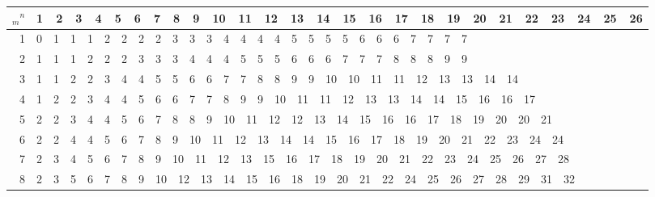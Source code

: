 \documentclass[11pt]{article}
\begin{document}
    \begin{center}
        \tiny
        \begin{tabular}{r|l}
            \hline
            ${}_m{}^n$ & 1~~\phantom{0}2~~\phantom{0}3~~\phantom{0}4~~\phantom{0}5~~\phantom{0}6~~\phantom{0}7~~\phantom{0}8~~\phantom{0}9~~10~~11~~12~~13~~14~~15~~16~~17~~18~~19~~20~~21~~22~~23~~24~~25~~26 \\
            \hline
            1 & 0~~\phantom{0}1~~\phantom{0}1~~\phantom{0}1~~\phantom{0}2~~\phantom{0}2~~\phantom{0}2~~\phantom{0}2~~\phantom{0}3~~\phantom{0}3~~\phantom{0}3~~\phantom{0}4~~\phantom{0}4~~\phantom{0}4~~\phantom{0}4~~\phantom{0}5~~\phantom{0}5~~\phantom{0}5~~\phantom{0}5~~\phantom{0}6~~\phantom{0}6~~\phantom{0}6~~\phantom{0}7~~\phantom{0}7~~\phantom{0}7~~\phantom{0}7 \\
            2 & 1~~\phantom{0}1~~\phantom{0}1~~\phantom{0}2~~\phantom{0}2~~\phantom{0}2~~\phantom{0}3~~\phantom{0}3~~\phantom{0}3~~\phantom{0}4~~\phantom{0}4~~\phantom{0}4~~\phantom{0}5~~\phantom{0}5~~\phantom{0}5~~\phantom{0}6~~\phantom{0}6~~\phantom{0}6~~\phantom{0}7~~\phantom{0}7~~\phantom{0}7~~\phantom{0}8~~\phantom{0}8~~\phantom{0}8~~\phantom{0}9~~\phantom{0}9 \\
            3 & 1~~\phantom{0}1~~\phantom{0}2~~\phantom{0}2~~\phantom{0}3~~\phantom{0}4~~\phantom{0}4~~\phantom{0}5~~\phantom{0}5~~\phantom{0}6~~\phantom{0}6~~\phantom{0}7~~\phantom{0}7~~\phantom{0}8~~\phantom{0}8~~\phantom{0}9~~\phantom{0}9~~10~~10~~11~~11~~12~~13~~13~~14~~14 \\
            4 & 1~~\phantom{0}2~~\phantom{0}2~~\phantom{0}3~~\phantom{0}4~~\phantom{0}4~~\phantom{0}5~~\phantom{0}6~~\phantom{0}6~~\phantom{0}7~~\phantom{0}7~~\phantom{0}8~~\phantom{0}9~~\phantom{0}9~~10~~11~~11~~12~~13~~13~~14~~14~~15~~16~~16~~17 \\
            5 & 2~~\phantom{0}2~~\phantom{0}3~~\phantom{0}4~~\phantom{0}4~~\phantom{0}5~~\phantom{0}6~~\phantom{0}7~~\phantom{0}8~~\phantom{0}8~~\phantom{0}9~~10~~11~~12~~12~~13~~14~~15~~16~~16~~17~~18~~19~~20~~20~~21 \\
            6 & 2~~\phantom{0}2~~\phantom{0}4~~\phantom{0}4~~\phantom{0}5~~\phantom{0}6~~\phantom{0}7~~\phantom{0}8~~\phantom{0}9~~10~~11~~12~~13~~14~~14~~15~~16~~17~~18~~19~~20~~21~~22~~23~~24~~24 \\
            7 & 2~~\phantom{0}3~~\phantom{0}4~~\phantom{0}5~~\phantom{0}6~~\phantom{0}7~~\phantom{0}8~~\phantom{0}9~~10~~11~~12~~13~~15~~16~~17~~18~~19~~20~~21~~22~~23~~24~~25~~26~~27~~28 \\
            8 & 2~~\phantom{0}3~~\phantom{0}5~~\phantom{0}6~~\phantom{0}7~~\phantom{0}8~~\phantom{0}9~~10~~12~~13~~14~~15~~16~~18~~19~~20~~21~~22~~24~~25~~26~~27~~28~~29~~31~~32 \\

\end{tabular}
\end{center}
\end{document}
